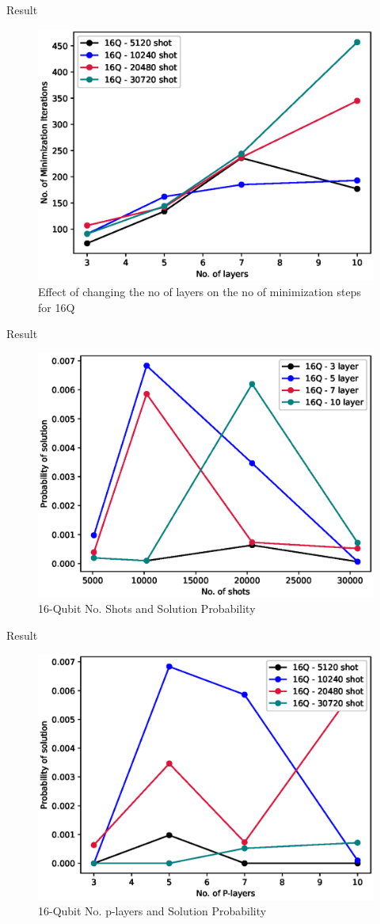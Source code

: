 \documentclass[14pt, aspectratio=169]{beamer}
\begin{document}
\begin{frame}{Result}
    \begin{figure}
        \includegraphics[width=0.5\linewidth]{images/p_iterations/16_all_p-iteration.eps}
        \caption{Effect of changing the no of layers on the no of minimization steps for 16Q}
        \label{fig:cost_prob_6}
    \end{figure}
\end{frame}


\begin{frame}{Result}
    \begin{figure}
        \includegraphics[width=0.5\linewidth]{images/shots_solutions/16_all_shots-solution.eps}
        \caption{16-Qubit No. Shots and Solution Probability }
        \label{fig:cost_prob_24}
    \end{figure}
\end{frame}

\begin{frame}{Result}
    \begin{figure}
        \includegraphics[width=0.5\linewidth]{images/p_solutions/16_all_p-solution.eps}
        \caption{16-Qubit No. p-layers and Solution Probability }
        \label{fig:cost_prob_24}
    \end{figure}
\end{frame}
\end{document}
